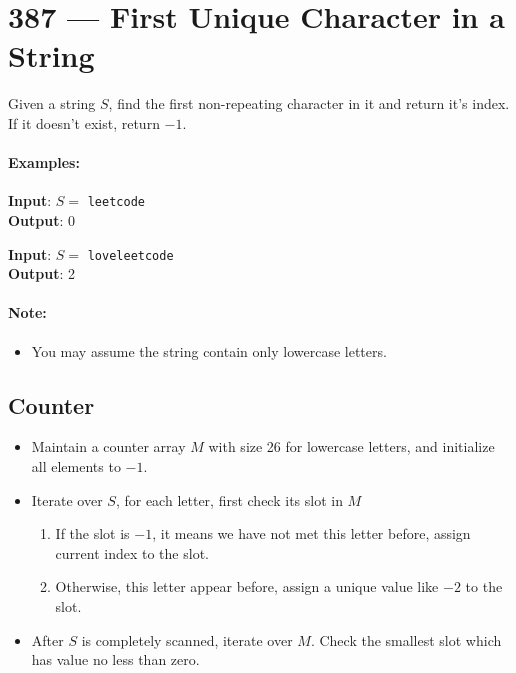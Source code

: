\section{387 --- First Unique Character in a String}
Given a string $S$, find the first non-repeating character in it and return it's index. If it doesn't exist, return $-1$.

\paragraph{Examples:}
\begin{flushleft}
\textbf{Input}: $S = $ \texttt{leetcode}
\\
\textbf{Output}: 0
\end{flushleft}

\begin{flushleft}
\textbf{Input}: $S = $ \texttt{loveleetcode}
\\
\textbf{Output}: 2
\end{flushleft}


\paragraph{Note:} 
\begin{itemize}
\item You may assume the string contain only lowercase letters. 
\end{itemize}

\subsection{Counter}
\begin{itemize}
\item Maintain a counter array $M$ with size 26 for lowercase letters, and initialize all elements to $-1$.
\item Iterate over $S$, for each letter, first check its slot in $M$
\begin{enumerate}
\item If the slot is $-1$, it means we have not met this letter before, assign current index to the slot.
\item Otherwise, this letter appear before, assign a unique value like $-2$ to the slot.
\end{enumerate}
\item After $S$ is completely scanned, iterate over $M$. Check the smallest slot which has value no less than zero.
\end{itemize}

